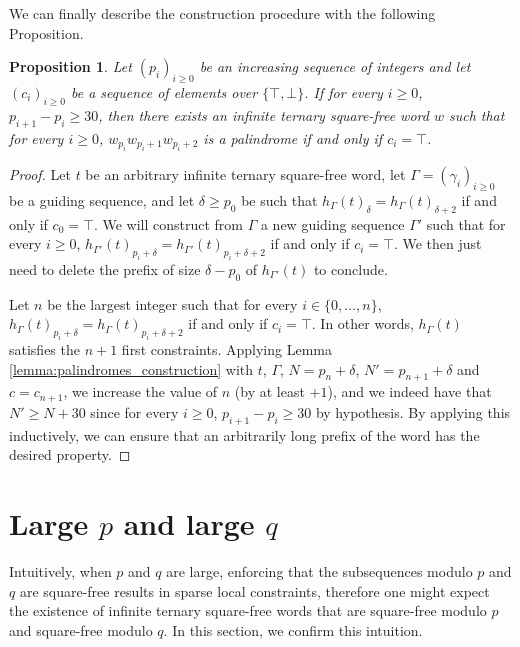 \documentclass[12pt]{article}
\newtheorem{proposition}[theorem]{Proposition}
\theoremstyle{definition}
\begin{document}
We can finally describe the construction procedure with the following Proposition.
\begin{proposition}\label{prop:palindromes}
    Let $(p_i)_{i \geq 0}$ be an increasing sequence of integers and let $(c_i)_{i \geq 0}$ be a sequence of elements over $\{\top, \bot\}$. If for every $i \geq 0$, $p_{i + 1} - p_i \geq 30$, then there exists an infinite ternary square-free word $w$ such that for every $i \geq 0$, $w_{p_i}w_{p_i + 1}w_{p_i + 2}$ is a palindrome if and only if $c_i = \top$.
\end{proposition}

\begin{proof}
Let $t$ be an arbitrary infinite ternary square-free word, let $\Gamma = (\gamma_i)_{i \geq 0}$ be a guiding sequence, and let $\delta\ge p_0$ be such that $h_{\Gamma}(t)_\delta = h_{\Gamma}(t)_{\delta + 2}$ if and only if $c_0 = \top$. 
We will construct from $\Gamma$ a new guiding sequence $\Gamma'$ such that for every $i \geq 0$, $h_{\Gamma'}(t)_{p_i + \delta} = h_{\Gamma'}(t)_{p_i + \delta + 2}$ if and only if $c_i = \top$. We then just need to delete the prefix of size $\delta - p_0$ of $h_{\Gamma'}(t)$ to conclude.    

Let $n$ be the largest integer such that for every $i \in \{0, \dots, n\}$, $h_\Gamma(t)_{p_i + \delta} = h_\Gamma(t)_{p_i + \delta + 2}$ if and only if $c_i = \top$. In other words, $h_\Gamma(t)$ satisfies the $n+1$ first constraints. Applying Lemma \ref{lemma:palindromes_construction} with $t$, $\Gamma$, $N = p_n + \delta$, $N' = p_{n + 1} + \delta$ and $c = c_{n + 1}$, we increase the value of $n$ (by at least $+ 1$), and we indeed have that $N' \ge N + 30$ since for every $i \ge 0$, $p_{i + 1}-  p_i \ge 30$ by hypothesis. By applying this inductively, we can ensure that an arbitrarily long prefix of the word has the desired property.
\end{proof}
  

\section{Large $p$ and large $q$}\label{chap:pqlarge}

Intuitively, when $p$ and $q$ are large, enforcing that the subsequences modulo $p$ and $q$ are square-free results in sparse local constraints, therefore one might expect the existence of infinite ternary square-free words that are square-free modulo $p$ and square-free modulo $q$. 
In this section, we confirm this intuition. 
 
\end{document}
